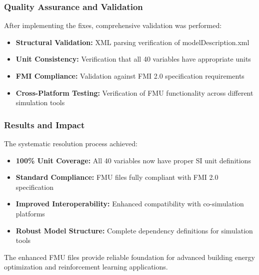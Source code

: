 \documentclass[12pt,a4paper]{article}
\begin{document}
\subsubsection{Quality Assurance and Validation}

After implementing the fixes, comprehensive validation was performed:

\begin{itemize}
    \item \textbf{Structural Validation:} XML parsing verification of modelDescription.xml
    \item \textbf{Unit Consistency:} Verification that all 40 variables have appropriate units
    \item \textbf{FMI Compliance:} Validation against FMI 2.0 specification requirements
    \item \textbf{Cross-Platform Testing:} Verification of FMU functionality across different simulation tools
\end{itemize}

\subsubsection{Results and Impact}

The systematic resolution process achieved:

\begin{itemize}
    \item \textbf{100\% Unit Coverage:} All 40 variables now have proper SI unit definitions
    \item \textbf{Standard Compliance:} FMU files fully compliant with FMI 2.0 specification
    \item \textbf{Improved Interoperability:} Enhanced compatibility with co-simulation platforms
    \item \textbf{Robust Model Structure:} Complete dependency definitions for simulation tools
\end{itemize}

The enhanced FMU files provide reliable foundation for advanced building energy optimization and reinforcement learning applications.
\end{document}
